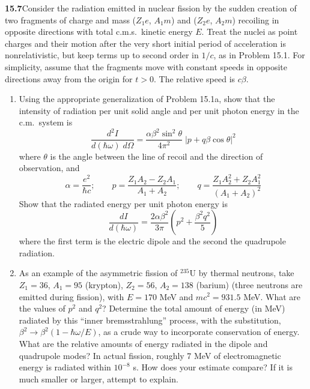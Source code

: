 \par\bigskip
\noindent\textbf{15.7}\quad Consider the radiation emitted in nuclear fission by the sudden creation of two fragments of charge and mass ($Z_{1}e$, $A_{1}m$) and ($Z_{2}e$, $A_{2}m$) recoiling in opposite directions with total c.m.s.\ kinetic energy $E$. Treat the nuclei as point charges and their motion after the very short initial period of acceleration is nonrelativistic, but keep terms up to second order in $1/c$, as in Problem 15.1. For simplicity, assume that the fragments move with constant speeds in opposite directions away from the origin for $t>0$. The relative speed is $c\beta$.
\begin{enumerate}
\item[(a)] Using the appropriate generalization of Problem 15.1a, show that the intensity of radiation per unit solid angle and per unit photon energy in the c.m.\ system is
\[
\frac{d^{2}I}{d(\hbar\omega)\;d\Omega}=\frac{\alpha\beta^{2}\sin^{2}\theta}{4\pi^{2}}\;|p+q\beta\cos\theta|^{2}
\]
where $\theta$ is the angle between the line of recoil and the direction of observation, and
\[
\alpha=\frac{e^{2}}{\hbar c};\qquad
p=\frac{Z_{1}A_{2}-Z_{2}A_{1}}{A_{1}+A_{2}};\qquad
q=\frac{Z_{1}A_{2}^{2}+Z_{2}A_{1}^{2}}{(A_{1}+A_{2})^{2}}
\]
Show that the radiated energy per unit photon energy is
\[
\frac{dI}{d(\hbar\omega)}=\frac{2\alpha\beta^{2}}{3\pi}\left(p^{2}+\frac{\beta^{2}q^{2}}{5}\right)
\]
where the first term is the electric dipole and the second the quadrupole radiation.
\item[(b)] As an example of the asymmetric fission of $^{235}$U by thermal neutrons, take $Z_{1}=36$, $A_{1}=95$ (krypton), $Z_{2}=56$, $A_{2}=138$ (barium) (three neutrons are emitted during fission), with $E=170$ MeV and $mc^{2}=931.5$ MeV. What are the values of $p^{2}$ and $q^{2}$? Determine the total amount of energy (in MeV) radiated by this ``inner bremsstrahlung'' process, with the substitution, $\beta^{2}\to\beta^{2}(1-\hbar\omega/E)$, as a crude way to incorporate conservation of energy. What are the relative amounts of energy radiated in the dipole and quadrupole modes? In actual fission, roughly 7 MeV of electromagnetic energy is radiated within $10^{-8}$ s. How does your estimate compare? If it is much smaller or larger, attempt to explain.
\end{enumerate}
\solution

